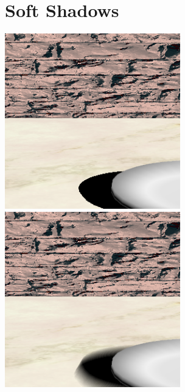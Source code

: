 \documentclass{article}
\begin{document}
\section{Soft Shadows}
\includegraphics[width=3in]{Assets/no_soft_shadows.png}
\includegraphics[width=3in]{Assets/soft_shadows.png}
\end{document}
